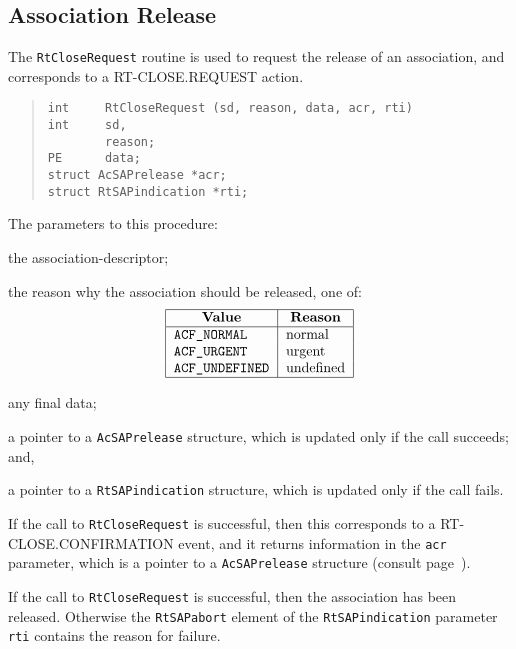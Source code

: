 \subsection	{Association Release}
The \verb"RtCloseRequest" routine is used to request the release of an
association,
and corresponds to a {\sf RT-CLOSE.REQUEST\/} action.
\begin{quote}\small\begin{verbatim}
int     RtCloseRequest (sd, reason, data, acr, rti)
int     sd,
        reason;
PE      data;
struct AcSAPrelease *acr;
struct RtSAPindication *rti;
\end{verbatim}\end{quote}
The parameters to this procedure:
\begin{describe}
\item[\verb"sd":] the association-descriptor;

\item[\verb"reason":] the reason why the association should be released,
one of:
\[\begin{tabular}{|l|l|}
\hline
    \multicolumn{1}{|c|}{\bf Value}&
		\multicolumn{1}{c|}{\bf Reason}\\
\hline
    \tt ACF\_NORMAL&	normal\\
    \tt ACF\_URGENT&	urgent\\
    \tt ACF\_UNDEFINED&	undefined\\
\hline
\end{tabular}\]

\item[\verb"data":] any final data;

\item[\verb"acr":] a pointer to a \verb"AcSAPrelease" structure,
which is updated only if the call succeeds;
and,

\item[\verb"rti":] a pointer to a \verb"RtSAPindication" structure,
which is updated only if the call fails.
\end{describe}
If the call to \verb"RtCloseRequest" is successful,
then this corresponds to a {\sf RT-CLOSE.CONFIRMATION\/} event,
and it returns information in the \verb"acr" parameter,
which is a pointer to a \verb"AcSAPrelease" structure
(consult page~\pageref{AcSAPrelease}).

If the call to \verb"RtCloseRequest" is successful,
then the association has been released.
Otherwise the \verb"RtSAPabort" element of the \verb"RtSAPindication"
parameter \verb"rti" contains the reason for failure.

